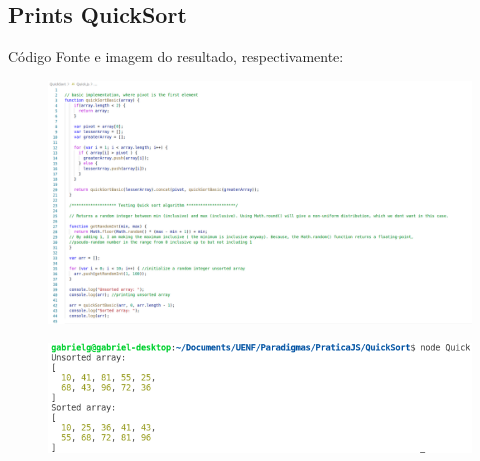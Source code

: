 \subsection{Prints QuickSort}
	Código Fonte e imagem do resultado, respectivamente:
	\begin{figure}[H]
		\centering
		\includegraphics[width=0.95\linewidth]{Pictures/QuickCode}
		\caption{}
		\label{fig:quickcode}
	\end{figure}
	
	\begin{figure}[H]
		\centering
		\includegraphics[width=0.95\linewidth]{Pictures/QuickResult}
		\caption{}
		\label{fig:quickresult}
	\end{figure}
	
	
	
